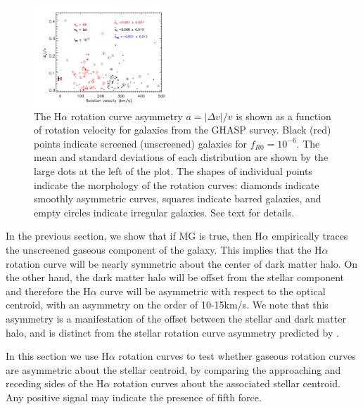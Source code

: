 \documentclass[useAMS,usenatbib,twocolumn]{mn2e}
\newcommand{\ha}{H$\alpha$}
\begin{document}
\begin{figure}
\begin{center}
\includegraphics[trim= 3cm 0cm 0cm 0cm, clip = true, width=0.45\textwidth]
{figures/GHASP2.png}
\caption{The  \ha{} rotation curve asymmetry $a=|\Delta v|/v$ is shown as a
function of rotation velocity for  galaxies from the GHASP survey. Black (red) points
indicate screened (unscreened) galaxies for $f_{R0}=10^{-6}$.
The mean and standard deviations of each distribution are shown by the large
dots at the left of the plot. The shapes of individual points indicate the 
morphology of the rotation curves: diamonds indicate smoothly asymmetric
curves, squares indicate barred galaxies, and empty circles indicate irregular
galaxies.  See  text for details.
\label{fig:plotsGHASP}}
\end{center}
\end{figure}

In the previous section, we show that if MG is true, then \ha{} empirically
traces the unscreened gaseous component of the galaxy. This implies
that the \ha{} rotation curve will be nearly symmetric about the
center of dark matter halo. On the other hand, the dark matter halo will be
offset from the stellar component and therefore the \ha{} curve will be
asymmetric with respect to the optical centroid, with an asymmetry on
the order of 10-15km/s. We note that this asymmetry is
a manifestation of the offset between the stellar and dark matter halo,
and is distinct from the stellar rotation curve asymmetry predicted by
\citet{bhuvjake2011}.

In this section we use \ha{} rotation curves to test
whether gaseous rotation curves are asymmetric about the stellar centroid,
by comparing the approaching and receding sides of the \ha{} rotation curves
about the associated stellar centroid. Any
positive signal may indicate the presence of fifth force.
\end{document}
